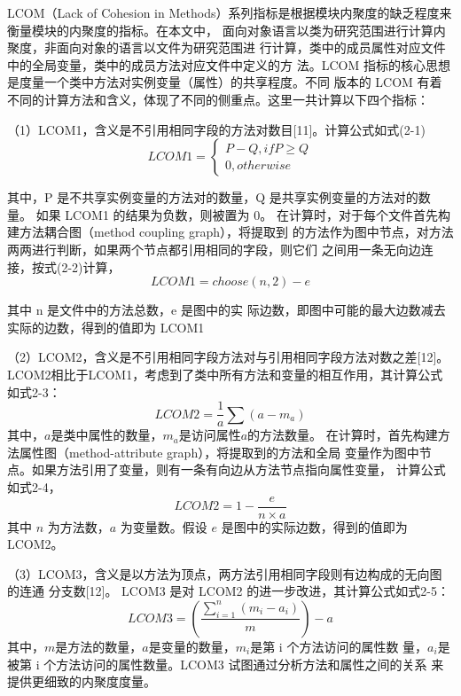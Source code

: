 LCOM（Lack of Cohesion in Methods）系列指标是根据模块内聚度的缺乏程度来衡量模块的内聚度的指标。在本文中，
面向对象语言以类为研究范围进行计算内聚度，非面向对象的语言以文件为研究范围进
行计算，类中的成员属性对应文件中的全局变量，类中的成员方法对应文件中定义的方
法。LCOM 指标的核心思想是度量一个类中方法对实例变量（属性）的共享程度。不同
版本的 LCOM 有着不同的计算方法和含义，体现了不同的侧重点。这里一共计算以下四个指标：


（1）LCOM1，含义是不引用相同字段的方法对数目[11]。计算公式如式(2-1)
\begin{equation}
    {LCOM1}=\left\{
        \begin{array}
        {c}P-Q,  ifP\geq Q \\
        0,  otherwise
        \end{array}\right.
\end{equation}

其中，P 是不共享实例变量的方法对的数量，Q 是共享实例变量的方法对的数量。
如果 LCOM1 的结果为负数，则被置为 0。
在计算时，对于每个文件首先构建方法耦合图（method coupling graph），将提取到
的方法作为图中节点，对方法两两进行判断，如果两个节点都引用相同的字段，则它们
之间用一条无向边连接，按式(2-2)计算，
\begin{equation}
LCOM1 = choose(n,2)-e
\end{equation}

其中 n 是文件中的方法总数，e 是图中的实
际边数，即图中可能的最大边数减去实际的边数，得到的值即为 LCOM1

（2）LCOM2，含义是不引用相同字段方法对与引用相同字段方法对数之差[12]。
LCOM2相比于LCOM1，考虑到了类中所有方法和变量的相互作用，其计算公式如式2-3：
\begin{equation}
{LCOM2}=\frac{1}{{a}}{\sum(a-m_{a})}
\end{equation}
其中，\(a\)是类中属性的数量，\( m_a \)是访问属性\(a\)的方法数量。
在计算时，首先构建方法属性图（method-attribute graph），将提取到的方法和全局
变量作为图中节点。如果方法引用了变量，则有一条有向边从方法节点指向属性变量，
计算公式如式2-4，
\begin{equation}
{LCOM2} = 1 - \frac{e}{n \times a}
\end{equation}
其中 \(n\) 为方法数，\(a\) 为变量数。假设 \(e\) 是图中的实际边数，得到的值即为 LCOM2。

（3）LCOM3，含义是以方法为顶点，两方法引用相同字段则有边构成的无向图的连通
分支数[12]。
LCOM3 是对 LCOM2 的进一步改进，其计算公式如式2-5：
\begin{equation}
{LCOM3=(\frac{\sum_{i=1}^n(m_i-a_i)}{m})-a}
\end{equation}
其中，\(m\)是方法的数量，\(a\)是变量的数量，\( m_i \)是第 i 个方法访问的属性数
量，\( a_i \)是被第 i 个方法访问的属性数量。LCOM3 试图通过分析方法和属性之间的关系
来提供更细致的内聚度度量。

